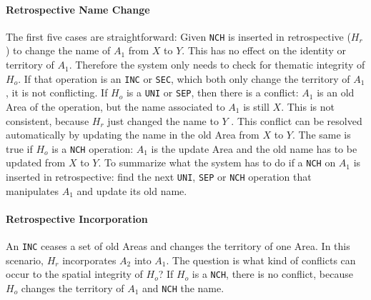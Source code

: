 
\paragraph{Retrospective Name Change} %
\label{par:retrospective_name_change}

The first five cases are straightforward: Given \texttt{NCH} is inserted in retrospective ($H_r$) to change the name of $A_1$ from $X$ to $Y$. This has no effect on the identity or territory of $A_1$. Therefore the system only needs to check for thematic integrity of $H_o$. If that operation is an \texttt{INC} or \texttt{SEC}, which both only change the territory of $A_1$, it is not conflicting. If $H_o$ is a \texttt{UNI} or \texttt{SEP}, then there is a conflict: $A_1$ is an old Area of the operation, but the name associated to $A_1$ is still $X$. This is not consistent, because $H_r$ just changed the name to $Y$ . This conflict can be resolved automatically by updating the name in the old Area from $X$ to $Y$. The same is true if $H_o$ is a \texttt{NCH} operation: $A_1$ is the update Area and the old name has to be updated from $X$ to $Y$. To summarize what the system has to do if a \texttt{NCH} on $A_1$ is inserted in retrospective: find the next \texttt{UNI}, \texttt{SEP} or \texttt{NCH} operation that manipulates $A_1$ and update its old name.


\paragraph{Retrospective Incorporation} %
\label{par:retrospective_incorporation}

An \texttt{INC} ceases a set of old Areas and changes the territory of one Area. In this scenario, $H_r$ incorporates $A_2$ into $A_1$. The question is what kind of conflicts can occur to the spatial integrity of $H_o$? If $H_o$ is  a \texttt{NCH}, there is no conflict, because $H_o$ changes the territory of $A_1$ and \texttt{NCH} the name.

